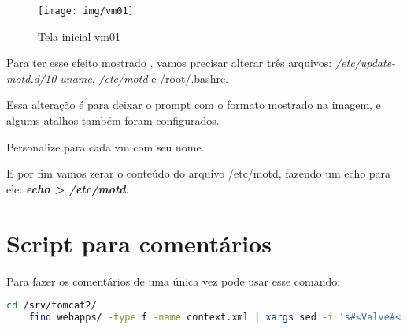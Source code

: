 \begin{figure}[H]
	\centering
	\caption[tela inicial vm01]{Tela inicial vm01}
	\texttt{[image: img/vm01]}
	\label{fig:vm01}
\end{figure}

Para ter esse efeito mostrado , vamos precisar alterar três arquivos:
	\emph{/etc/update-motd.d/10-uname}, \emph{/etc/motd} e /root/.bashrc.

Essa alteração é para deixar o prompt com o formato mostrado na imagem, e algums atalhos também foram configurados.


Personalize para cada vm com seu nome.


E por fim vamos zerar o conteúdo do arquivo /etc/motd, fazendo um echo para ele: \emph{\textbf{echo > /etc/motd}}.

\section{Script para comentários}

Para fazer os comentários de uma única vez pode usar esse comando:

\begin{lstlisting}[label=commentXml,language=bash,breaklines=true,basicstyle=\ttfamily,caption={Incluir comentários em arquivos context.xml}]
	cd /srv/tomcat2/ 
	find webapps/ -type f -name context.xml | xargs sed -i 's#<Valve#<!--<Valve#g;s#|0:0:0:0:0:0:0:1" />#"|0:0:0:0:0:0:0:1" />-->#g' 
\end{lstlisting}
